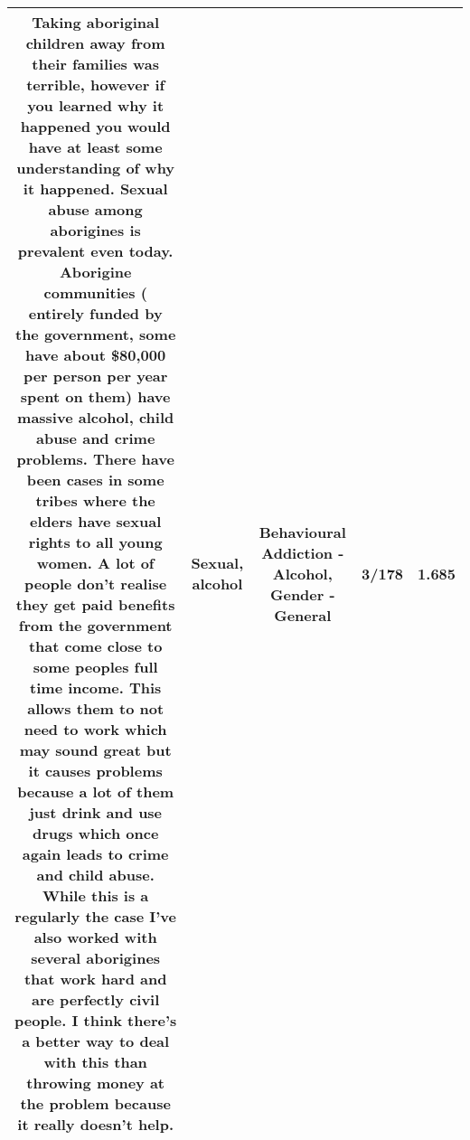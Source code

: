 \documentclass[11pt]{article}
\newlength\mylength
\begin{document}
\begin{center}
\begin{longtable}{|C{.65\mylength}|C{.30\mylength}|C{.12\mylength}|C{.12\mylength}|C{.12\mylength}|}
  \small Taking aboriginal children away from their families was terrible, however if you learned why it happened you would have at least some understanding of why it happened. \textbf{Sexual} abuse among aborigines is prevalent even today. Aborigine communities ( entirely funded by the government, some have about \$80,000 per person per year spent on them) have massive \textbf{alcohol}, child abuse and crime problems. There have been cases in some tribes where the elders have \textbf{sexual} rights to all young women. A lot of people don't realise they get paid benefits from the government that come close to some peoples full time income. This allows them to not need to work which may sound great but it causes problems because a lot of them just drink and use drugs which once again leads to crime and child abuse. While this is a regularly the case I've also worked with several aborigines that work hard and are perfectly civil people. I think there's a better way to deal with this than throwing money at the problem because it really doesn't help.\normalsize   & Sexual, alcohol & Behavioural Addiction - Alcohol, Gender - General & 3/178 & 1.685 \\  \hline

\end{longtable}
\end{center}
\end{document}
